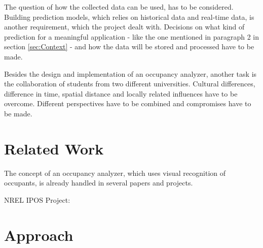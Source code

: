 The question of how the collected data can be used, has to be considered. Building prediction models, which relies on historical data and real-time data, is another requirement, which the project dealt with. Decisions on what kind of prediction for a meaningful application - like the one mentioned in paragraph 2 in section \ref{sec:Context} - and how the data will be stored and processed have to be made.

Besides the design and implementation of an occupancy analyzer, another task is the collaboration of students from two different universities. Cultural differences, difference in time, spatial distance and locally related influences have to be overcome. Different perspectives have to be combined and compromises have to be made.


\section{Related Work}


The concept of an occupancy analyzer, which uses visual recognition of occupants, is already handled in several papers and projects.


NREL IPOS Project:



\section{Approach}

